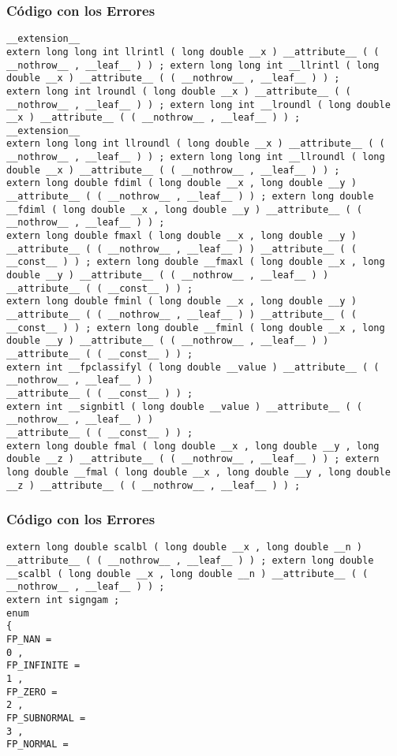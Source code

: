 \documentclass{beamer}
\begin{document}
\begin{frame}[fragile]
\frametitle{C\'odigo con los Errores}
\begin{verbatim}
__extension__ 
extern long long int llrintl ( long double __x ) __attribute__ ( ( __nothrow__ , __leaf__ ) ) ; extern long long int __llrintl ( long double __x ) __attribute__ ( ( __nothrow__ , __leaf__ ) ) ; 
extern long int lroundl ( long double __x ) __attribute__ ( ( __nothrow__ , __leaf__ ) ) ; extern long int __lroundl ( long double __x ) __attribute__ ( ( __nothrow__ , __leaf__ ) ) ; 
__extension__ 
extern long long int llroundl ( long double __x ) __attribute__ ( ( __nothrow__ , __leaf__ ) ) ; extern long long int __llroundl ( long double __x ) __attribute__ ( ( __nothrow__ , __leaf__ ) ) ; 
extern long double fdiml ( long double __x , long double __y ) __attribute__ ( ( __nothrow__ , __leaf__ ) ) ; extern long double __fdiml ( long double __x , long double __y ) __attribute__ ( ( __nothrow__ , __leaf__ ) ) ; 
extern long double fmaxl ( long double __x , long double __y ) __attribute__ ( ( __nothrow__ , __leaf__ ) ) __attribute__ ( ( __const__ ) ) ; extern long double __fmaxl ( long double __x , long double __y ) __attribute__ ( ( __nothrow__ , __leaf__ ) ) __attribute__ ( ( __const__ ) ) ; 
extern long double fminl ( long double __x , long double __y ) __attribute__ ( ( __nothrow__ , __leaf__ ) ) __attribute__ ( ( __const__ ) ) ; extern long double __fminl ( long double __x , long double __y ) __attribute__ ( ( __nothrow__ , __leaf__ ) ) __attribute__ ( ( __const__ ) ) ; 
extern int __fpclassifyl ( long double __value ) __attribute__ ( ( __nothrow__ , __leaf__ ) ) 
__attribute__ ( ( __const__ ) ) ; 
extern int __signbitl ( long double __value ) __attribute__ ( ( __nothrow__ , __leaf__ ) ) 
__attribute__ ( ( __const__ ) ) ; 
extern long double fmal ( long double __x , long double __y , long double __z ) __attribute__ ( ( __nothrow__ , __leaf__ ) ) ; extern long double __fmal ( long double __x , long double __y , long double __z ) __attribute__ ( ( __nothrow__ , __leaf__ ) ) ; 
\end{verbatim}
\end{frame}
\begin{frame}[fragile]
\frametitle{C\'odigo con los Errores}
\begin{verbatim}
extern long double scalbl ( long double __x , long double __n ) __attribute__ ( ( __nothrow__ , __leaf__ ) ) ; extern long double __scalbl ( long double __x , long double __n ) __attribute__ ( ( __nothrow__ , __leaf__ ) ) ; 
extern int signgam ; 
enum 
{ 
FP_NAN = 
0 , 
FP_INFINITE = 
1 , 
FP_ZERO = 
2 , 
FP_SUBNORMAL = 
3 , 
FP_NORMAL = 
\end{verbatim}
\end{frame}
\end{document}

